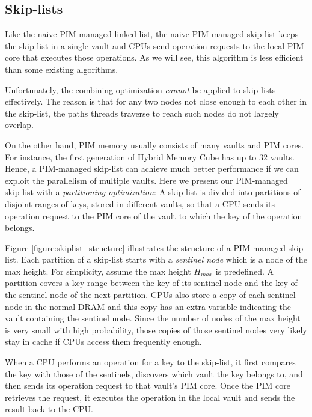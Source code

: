\subsection{Skip-lists}
\label{section:skip_list}


Like the naive PIM-managed linked-list,
the naive PIM-managed skip-list keeps the skip-list in a single vault and
CPUs send operation requests to the local PIM core that executes those operations.
As we will see, this algorithm is less efficient than some existing algorithms.

Unfortunately, the combining optimization \emph{cannot} be applied to skip-lists effectively.
The reason is that for any two nodes not close enough to each other in the skip-list,
the paths threads traverse to reach such nodes do not largely overlap.

On the other hand, PIM memory usually consists of many vaults and PIM cores.
For instance, the first generation of Hybrid Memory Cube \cite{website:HMC} has up to 32 vaults.
Hence, a PIM-managed skip-list can achieve much better performance if
we can exploit the parallelism of multiple vaults.
Here we present our PIM-managed skip-list with a \textit{partitioning optimization}:
A skip-list is divided into partitions of disjoint ranges of keys,
stored in different vaults, so that a CPU sends its operation request to
the PIM core of the vault to which the key of the operation belongs.

Figure \ref{figure:skiplist_structure} illustrates the structure of a PIM-managed skip-list.
Each partition of a skip-list starts with a \textit{sentinel node}
which is a node of the max height. 
For simplicity, assume the max height $H_{max}$ is predefined.
A partition covers a key range between the key of its sentinel node and
the key of the sentinel node of the next partition.
CPUs also store a copy of each sentinel node in the normal DRAM and 
this copy has an extra variable indicating the vault containing the sentinel node.
Since the number of nodes of the max height is very small with high probability, 
those copies of those sentinel nodes very likely stay in cache
if CPUs access them frequently enough.

When a CPU performs an operation for a key to the skip-list,
it first compares the key with those of the sentinels, discovers which vault
the key belongs to, and then sends its operation request to that vault's PIM core.
Once the PIM core retrieves the request, it executes the operation in the local vault 
and sends the result back to the CPU.


